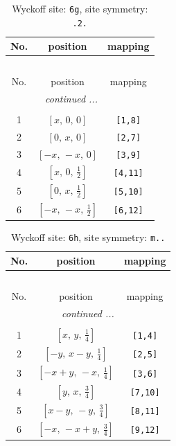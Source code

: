\documentclass[fleqn,8pt]{jsarticle}
\begin{document}
\renewcommand{\arraystretch}{1.2}
\begin{longtable}{ccc}
\caption{Wyckoff site: {\tt 6g}, site symmetry: {\tt .2.}}
 \\
 \hline \hline
No. & position & mapping \\ \hline \endfirsthead

\multicolumn{2}{l}{\tablename\ \thetable{}} \\
 \hline \hline
No. & position & mapping \\ \hline \endhead

 \hline \hline
\multicolumn{2}{r}{\footnotesize\it continued ...} \\ \endfoot

 \hline \hline
\multicolumn{2}{r}{} \\ \endlastfoot

1 & $\left[ x,\, 0,\, 0 \right]$ & {\tt [1,8]} \\ \hline
2 & $\left[ 0,\, x,\, 0 \right]$ & {\tt [2,7]} \\ \hline
3 & $\left[ - x,\, - x,\, 0 \right]$ & {\tt [3,9]} \\ \hline
4 & $\left[ x,\, 0,\, \frac{1}{2} \right]$ & {\tt [4,11]} \\ \hline
5 & $\left[ 0,\, x,\, \frac{1}{2} \right]$ & {\tt [5,10]} \\ \hline
6 & $\left[ - x,\, - x,\, \frac{1}{2} \right]$ & {\tt [6,12]} \\
\end{longtable}
\renewcommand{\arraystretch}{1.2}
\begin{longtable}{ccc}
\caption{Wyckoff site: {\tt 6h}, site symmetry: {\tt m..}}
 \\
 \hline \hline
No. & position & mapping \\ \hline \endfirsthead

\multicolumn{2}{l}{\tablename\ \thetable{}} \\
 \hline \hline
No. & position & mapping \\ \hline \endhead

 \hline \hline
\multicolumn{2}{r}{\footnotesize\it continued ...} \\ \endfoot

 \hline \hline
\multicolumn{2}{r}{} \\ \endlastfoot

1 & $\left[ x,\, y,\, \frac{1}{4} \right]$ & {\tt [1,4]} \\ \hline
2 & $\left[ - y,\, x - y,\, \frac{1}{4} \right]$ & {\tt [2,5]} \\ \hline
3 & $\left[ - x + y,\, - x,\, \frac{1}{4} \right]$ & {\tt [3,6]} \\ \hline
4 & $\left[ y,\, x,\, \frac{3}{4} \right]$ & {\tt [7,10]} \\ \hline
5 & $\left[ x - y,\, - y,\, \frac{3}{4} \right]$ & {\tt [8,11]} \\ \hline
6 & $\left[ - x,\, - x + y,\, \frac{3}{4} \right]$ & {\tt [9,12]} \\
\end{longtable}
\end{document}
